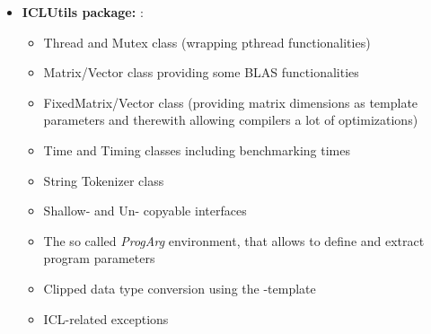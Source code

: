 \begin{itemize}
\item \textbf{ICLUtils package:} :\\
\begin{itemize}
        \item Thread and Mutex class (wrapping pthread functionalities)\\
           

        \item Matrix/Vector class providing some BLAS functionalities\\
           

        \item FixedMatrix/Vector class (providing matrix dimensions as template parameters and therewith allowing compilers a lot of optimizations)\\
            

        \item Time and Timing classes including benchmarking times\\
             

        \item String Tokenizer class\\

        \item Shallow- and Un- copyable interfaces\\
            

        \item The so called \emph{ProgArg} environment, that allows to define and extract program parameters\\
           
        \item Clipped data type conversion using the -template\\

        \item ICL-related exceptions\\


\end{itemize}
\end{itemize}
